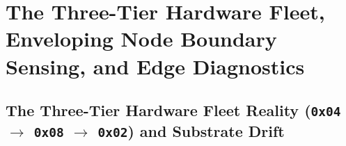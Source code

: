 \section{The Three-Tier Hardware Fleet, Enveloping Node Boundary Sensing, and Edge Diagnostics}
\label{sec:l2_living_mirror}

\subsection{The Three-Tier Hardware Fleet Reality (\texttt{0x04} $\to$ \texttt{0x08} $\to$ \texttt{0x02}) and Substrate Drift}

